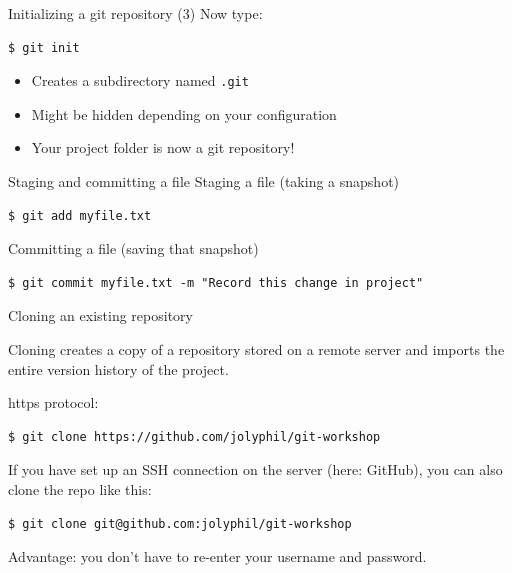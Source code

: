 \documentclass[handout]{beamer}
\begin{document}
\begin{frame}[fragile]{Initializing a git repository (3)}
	Now type:
\begin{lstlisting}
$ git init
\end{lstlisting}
	\begin{itemize}
		\item Creates a subdirectory named \texttt{.git}
		\item Might be hidden depending on your configuration
		\item Your project folder is now a git repository!
	\end{itemize}
\end{frame}

\begin{frame}[fragile]{Staging and committing a file}
Staging a file (taking a snapshot)
\begin{lstlisting}
$ git add myfile.txt
\end{lstlisting}
Committing a file (saving that snapshot)
\begin{lstlisting}
$ git commit myfile.txt -m "Record this change in project"
\end{lstlisting}
\end{frame}

\begin{frame}[fragile]{Cloning an existing repository}

Cloning creates a copy of a repository stored on a remote server and imports the entire version history of the project. 

\vspace{0.5cm}

https protocol:
	
\begin{lstlisting}
$ git clone https://github.com/jolyphil/git-workshop
\end{lstlisting}

If you have set up an SSH connection on the server (here: GitHub), you can also clone the repo like this: 

\begin{lstlisting}
$ git clone git@github.com:jolyphil/git-workshop
\end{lstlisting}

Advantage: you don't have to re-enter your username and password. 

\end{frame}
\end{document}
